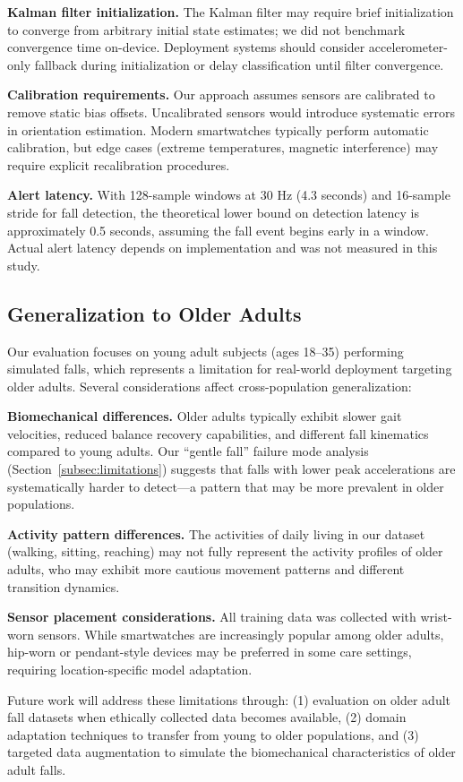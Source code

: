 \textbf{Kalman filter initialization.} The Kalman filter may require brief initialization to converge from arbitrary initial state estimates; we did not benchmark convergence time on-device. Deployment systems should consider accelerometer-only fallback during initialization or delay classification until filter convergence.

\textbf{Calibration requirements.} Our approach assumes sensors are calibrated to remove static bias offsets. Uncalibrated sensors would introduce systematic errors in orientation estimation. Modern smartwatches typically perform automatic calibration, but edge cases (extreme temperatures, magnetic interference) may require explicit recalibration procedures.

\textbf{Alert latency.} With 128-sample windows at 30 Hz (4.3 seconds) and 16-sample stride for fall detection, the theoretical lower bound on detection latency is approximately 0.5 seconds, assuming the fall event begins early in a window. Actual alert latency depends on implementation and was not measured in this study.

\subsection{Generalization to Older Adults}
\label{subsec:older_adults}

Our evaluation focuses on young adult subjects (ages 18--35) performing simulated falls, which represents a limitation for real-world deployment targeting older adults. Several considerations affect cross-population generalization:

\textbf{Biomechanical differences.} Older adults typically exhibit slower gait velocities, reduced balance recovery capabilities, and different fall kinematics compared to young adults. Our ``gentle fall'' failure mode analysis (Section~\ref{subsec:limitations}) suggests that falls with lower peak accelerations are systematically harder to detect---a pattern that may be more prevalent in older populations.

\textbf{Activity pattern differences.} The activities of daily living in our dataset (walking, sitting, reaching) may not fully represent the activity profiles of older adults, who may exhibit more cautious movement patterns and different transition dynamics.

\textbf{Sensor placement considerations.} All training data was collected with wrist-worn sensors. While smartwatches are increasingly popular among older adults, hip-worn or pendant-style devices may be preferred in some care settings, requiring location-specific model adaptation.

Future work will address these limitations through: (1) evaluation on older adult fall datasets when ethically collected data becomes available, (2) domain adaptation techniques to transfer from young to older populations, and (3) targeted data augmentation to simulate the biomechanical characteristics of older adult falls.
